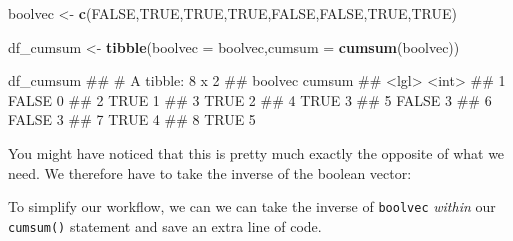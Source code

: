 \documentclass[]{book}
\newenvironment{Shaded}{\begin{snugshade}}{\end{snugshade}}
\newcommand{\KeywordTok}[1]{\textcolor[rgb]{0.13,0.29,0.53}{\textbf{#1}}}
\newcommand{\DataTypeTok}[1]{\textcolor[rgb]{0.13,0.29,0.53}{#1}}
\newcommand{\StringTok}[1]{\textcolor[rgb]{0.31,0.60,0.02}{#1}}
\newcommand{\OtherTok}[1]{\textcolor[rgb]{0.56,0.35,0.01}{#1}}
\newcommand{\OperatorTok}[1]{\textcolor[rgb]{0.81,0.36,0.00}{\textbf{#1}}}
\newcommand{\NormalTok}[1]{#1}
\begin{document}
\begin{Shaded}
\begin{Highlighting}[]

\NormalTok{boolvec <-}\StringTok{ }\KeywordTok{c}\NormalTok{(}\OtherTok{FALSE}\NormalTok{,}\OtherTok{TRUE}\NormalTok{,}\OtherTok{TRUE}\NormalTok{,}\OtherTok{TRUE}\NormalTok{,}\OtherTok{FALSE}\NormalTok{,}\OtherTok{FALSE}\NormalTok{,}\OtherTok{TRUE}\NormalTok{,}\OtherTok{TRUE}\NormalTok{)}

\NormalTok{df_cumsum <-}\StringTok{ }\KeywordTok{tibble}\NormalTok{(}\DataTypeTok{boolvec =}\NormalTok{ boolvec,}\DataTypeTok{cumsum =} \KeywordTok{cumsum}\NormalTok{(boolvec))}

\NormalTok{df_cumsum}
\NormalTok{## # A tibble: 8 x 2}
\NormalTok{##   boolvec cumsum}
\NormalTok{##   <lgl>    <int>}
\NormalTok{## 1 FALSE        0}
\NormalTok{## 2 TRUE         1}
\NormalTok{## 3 TRUE         2}
\NormalTok{## 4 TRUE         3}
\NormalTok{## 5 FALSE        3}
\NormalTok{## 6 FALSE        3}
\NormalTok{## 7 TRUE         4}
\NormalTok{## 8 TRUE         5}
\end{Highlighting}
\end{Shaded}

You might have noticed that this is pretty much exactly the opposite of
what we need. We therefore have to take the inverse of the boolean
vector:

\begin{Shaded}
\end{Shaded}

To simplify our workflow, we can we can take the inverse of
\texttt{boolvec} \emph{within} our \texttt{cumsum()} statement and save
an extra line of code.
\end{document}
